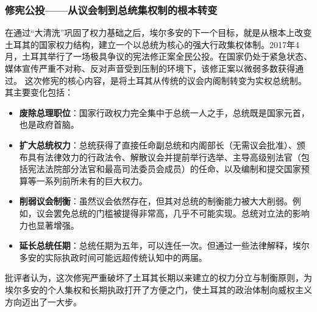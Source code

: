 \documentclass[UTF8, 10pt]{ctexbook}
\begin{document}
\subsubsection{修宪公投——从议会制到总统集权制的根本转变}
在通过“大清洗”巩固了权力基础之后，埃尔多安的下一个目标，就是从根本上改变土耳其的国家权力结构，建立一个以总统为核心的强大行政集权体制。2017年4月，土耳其举行了一场极具争议的宪法修正案全民公投。在国家仍处于紧急状态、媒体宣传严重不对称、反对声音受到压制的环境下，该修正案以微弱多数获得通过。
这次修宪的核心内容，是将土耳其从传统的议会内阁制转变为实权总统制。其主要变化包括：
\begin{itemize}
    \item \textbf{废除总理职位}：国家行政权力完全集中于总统一人之手，总统既是国家元首，也是政府首脑。
    \item \textbf{扩大总统权力}：总统获得了直接任命副总统和内阁部长（无需议会批准）、颁布具有法律效力的行政法令、解散议会并提前举行选举、主导高级别法官（包括宪法法院部分法官和最高司法委员会成员）的任命、以及编制和提交国家预算等一系列前所未有的巨大权力。
    \item \textbf{削弱议会制衡}：虽然议会依然存在，但其对总统的制衡能力被大大削弱。例如，议会罢免总统的门槛被提得非常高，几乎不可能实现。总统对立法的影响力也显著增强。
    \item \textbf{延长总统任期}：总统任期为五年，可以连任一次。但通过一些法律解释，埃尔多安的实际执政时间可能远超传统认知中的两届。
\end{itemize}
批评者认为，这次修宪严重破坏了土耳其长期以来建立的权力分立与制衡原则，为埃尔多安的个人集权和长期执政打开了方便之门，使土耳其的政治体制向威权主义方向迈出了一大步。
\end{document}
